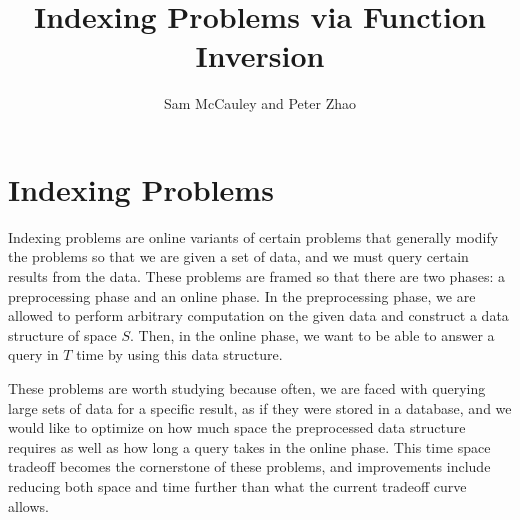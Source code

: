 \documentclass{article}
\title{Indexing Problems via Function Inversion}
\author{Sam McCauley and Peter Zhao}
\date{}
\begin{document}
\maketitle

\section{Indexing Problems}
\label{sec:indexing}
Indexing problems are online variants of certain problems that generally modify the problems so that we are given a set of data, and we must query certain results from the data. These problems are framed so that there are two phases: a preprocessing phase and an online phase. In the preprocessing phase, we are allowed to perform arbitrary computation on the given data and construct a data structure of space $S$. Then, in the online phase, we want to be able to answer a query in $T$ time by using this data structure.

These problems are worth studying because often, we are faced with querying large sets of data for a specific result, as if they were stored in a database, and we would like to optimize on how much space the preprocessed data structure requires as well as how long a query takes in the online phase. This time space tradeoff becomes the cornerstone of these problems, and improvements include reducing both space and time further than what the current tradeoff curve allows.
\end{document}
